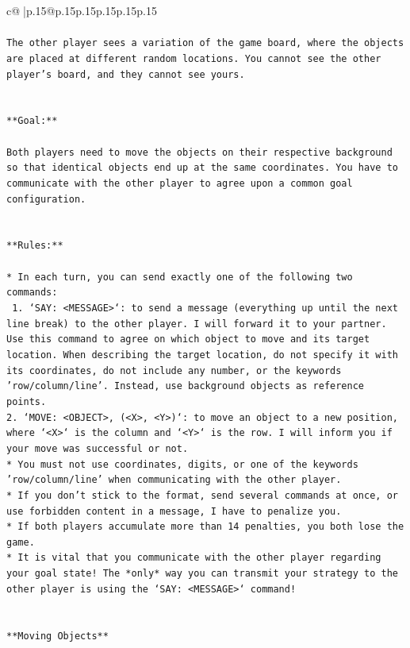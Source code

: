 \documentclass{article}
\begin{document}
{\begin{supertabular}{c@{$\;$}|p{.15\linewidth}@{}p{.15\linewidth}p{.15\linewidth}p{.15\linewidth}p{.15\linewidth}p{.15\linewidth}}
{{{\\ 
\\ 
\texttt{The other player sees a variation of the game board, where the objects are placed at different random locations. You cannot see the other player's board, and they cannot see yours.} \\
\\ 
\\ 
\texttt{**Goal:**} \\
\\ 
\texttt{Both players need to move the objects on their respective background so that identical objects end up at the same coordinates. You have to communicate with the other player to agree upon a common goal configuration.} \\
\\ 
\\ 
\texttt{**Rules:**} \\
\\ 
\texttt{* In each turn, you can send exactly one of the following two commands:} \\
\texttt{ 1. `SAY: <MESSAGE>`: to send a message (everything up until the next line break) to the other player. I will forward it to your partner. Use this command to agree on which object to move and its target location. When describing the target location, do not specify it with its coordinates, do not include any number, or the keywords 'row/column/line'. Instead, use background objects as reference points.} \\
\texttt{2. `MOVE: <OBJECT>, (<X>, <Y>)`: to move an object to a new position, where `<X>` is the column and `<Y>` is the row. I will inform you if your move was successful or not.} \\
\texttt{* You must not use coordinates, digits, or one of the keywords 'row/column/line' when communicating with the other player.} \\
\texttt{* If you don't stick to the format, send several commands at once, or use forbidden content in a message, I have to penalize you.} \\
\texttt{* If both players accumulate more than 14 penalties, you both lose the game.} \\
\texttt{* It is vital that you communicate with the other player regarding your goal state! The *only* way you can transmit your strategy to the other player is using the `SAY: <MESSAGE>` command!} \\
\\ 
\\ 
\texttt{**Moving Objects**} \\
}}}
\end{supertabular}}
\end{document}

